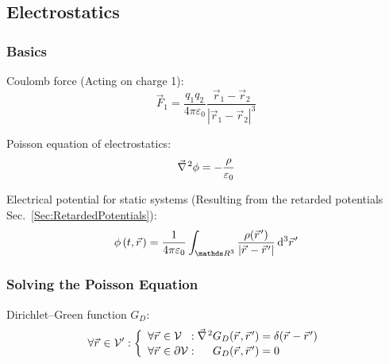 	\subsection{Electrostatics}
		\subsubsection{Basics}
			\noindent
			Coulomb force (Acting on charge 1):
			\begin{equation}
				\vec{F}_1 = \frac{q_1 q_2}{4\pi\varepsilon_0}\frac{\vec{r}_1-\vec{r}_2}{\left|\vec{r}_1-\vec{r}_2\right|^3}
			\end{equation}

			\noindent
			Poisson equation of electrostatics:
			\begin{equation}
				\Nabla^2\phi = -\frac{\rho}{\varepsilon_0}
				\label{Eq:Poisson}
			\end{equation}

			\noindent
			Electrical potential for static systems (Resulting from the retarded potentials Sec.~\ref{Sec:RetardedPotentials}):
			\begin{equation}
				\phi\left(t,\vec{r}\right)
				= \frac{1}{4\pi\varepsilon_0} \int_{\reals ^3} \frac{\rho(\vec{r}')}{\left|\vec{r}-\vec{r}'\right|}\dd[3]{\vec{r}'}
			\end{equation}

		\subsubsection{Solving the Poisson Equation}
			\noindent
			Dirichlet--Green function $G_D$:
			\begin{equation}
				\forall\vec{r}\in\mathcal{V}': \left\{\begin{array}{ll}
					\forall\vec{r}\in\mathcal{V}\phantom\partial:
					\Nabla^2 G_D(\vec{r},\vec{r}') = \delta(\vec{r}-\vec{r}') \\
					\forall\vec{r}\in\partial\mathcal{V}:
					\phantom{\Nabla^2}G_D(\vec{r},\vec{r}') = 0
				\end{array}\right.
			\end{equation}

